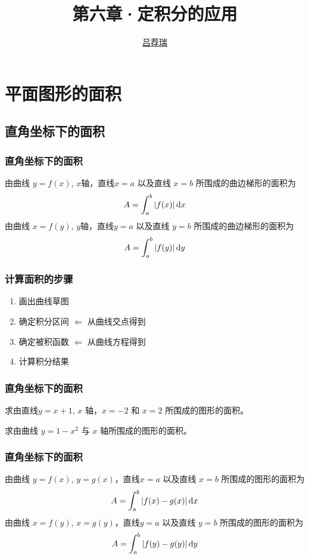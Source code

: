 \documentclass[14pt,notheorems,leqno,xcolor={rgb}]{beamer} %
\begin{document}

\title{第六章·定积分的应用}
\author{\href{https://lvjr.bitbucket.io}{吕荐瑞}}

\begin{frame}[plain]
\titlepage
\end{frame}

\section{平面图形的面积}

\subsection{直角坐标下的面积}

\begin{frame}
\frametitle{直角坐标下的面积}
由曲线 $y=f(x)$, $x$轴，直线$x=a$ 以及直线 $x=b$  所围成的曲边梯形的面积为
\[ A=\int_a^b |f(x)|\mathop{}\!\mathrm{d} x \]\pause
由曲线 $x=f(y)$, $y$轴，直线$y=a$ 以及直线 $y=b$ 所围成的曲边梯形的面积为
\[ A=\int_a^b |f(y)|\mathop{}\!\mathrm{d} y \]
\end{frame}

\begin{frame}
\frametitle{计算面积的步骤}
\pause
\begin{enumerate}
  \item 画出曲线草图\pause
  \item 确定积分区间 \pause $\Longleftarrow$ 从曲线交点得到\pause
  \item 确定被积函数 \pause $\Longleftarrow$ 从曲线方程得到\pause
  \item 计算积分结果
\end{enumerate}
\end{frame}

\begin{frame}
\frametitle{直角坐标下的面积}
\begin{example}
求由直线$y=x+1$, $x$ 轴，$x=-2$ 和 $x=2$ 所围成的图形的面积。
\end{example}
\vpause
\begin{exercise}
求由曲线 $y=1-x^2$ 与 $x$ 轴所围成的图形的面积。
\end{exercise}
\end{frame}

\begin{frame}
\frametitle{直角坐标下的面积}
由曲线 $y=f(x)$, $y=g(x)$，直线$x=a$ 以及直线 $x=b$ 所围成的图形的面积为
\[ A=\int_a^b |f(x)-g(x)|\mathop{}\!\mathrm{d} x \]\pause
由曲线 $x=f(y)$, $x=g(y)$，直线$y=a$ 以及直线 $y=b$ 所围成的图形的面积为
\[ A=\int_a^b |f(y)-g(y)|\mathop{}\!\mathrm{d} y \]
\end{frame}
\end{document}
